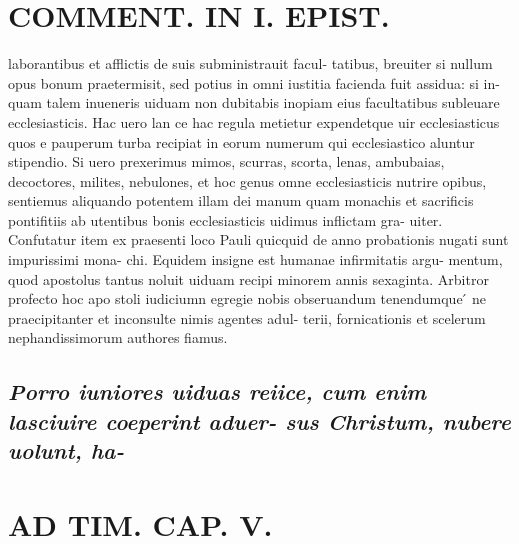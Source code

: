 \documentclass{article}
\begin{document}
\begin{pages}
\section*{COMMENT. IN I. EPIST. }\pstart laborantibus et afflictis de suis subministrauit facul- tatibus, breuiter si nullum opus bonum praetermisit, sed potius in omni iustitia facienda fuit assidua: si in- quam talem inueneris uiduam non dubitabis inopiam eius facultatibus subleuare ecclesiasticis. Hac uero lan ce hac regula metietur expendetque uir ecclesiasticus quos e pauperum turba recipiat in eorum numerum qui ecclesiastico aluntur stipendio. Si uero prexerimus mimos, scurras, scorta, lenas, ambubaias, decoctores, milites, nebulones, et hoc genus omne ecclesiasticis nutrire opibus, sentiemus aliquando potentem illam dei manum quam monachis et sacrificis pontifitiis ab utentibus bonis ecclesiasticis uidimus inflictam gra- uiter. Confutatur item ex praesenti loco Pauli quicquid de anno probationis nugati sunt impurissimi mona- chi. Equidem insigne est humanae infirmitatis argu- mentum, quod apostolus tantus noluit uiduam recipi minorem annis sexaginta. Arbitror profecto hoc apo stoli iudiciumn egregie nobis obseruandum tenendumque ́ ne praecipitanter et inconsulte nimis agentes adul- terii, fornicationis et scelerum nephandissimorum authores fiamus.  \pend
{}
{}
\subsection*{\textit{Porro iuniores uiduas reiice, cum enim lasciuire coeperint aduer- sus Christum, nubere uolunt, ha- }}
\section*{AD TIM. CAP. V. }
\marginpar{[ p.153 ]}
{}

\end{pages}
\end{document}
